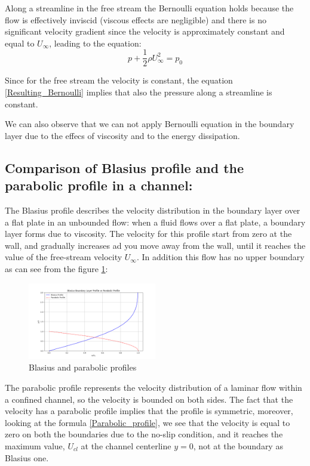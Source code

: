 \documentclass{article}
\begin{document}
Along a streamline in the free stream the Bernoulli equation holds because the flow is effectively inviscid (viscous effects are negligible) and there is no significant velocity gradient since the velocity is approximately constant and equal to  \( U_\infty \), leading to the equation:
\begin{equation} \label{Resulting_Bernoulli}
    p + \frac{1}{2}\rho U_\infty ^2 = p_0
\end{equation}

Since for the free stream the velocity is constant, the equation \eqref{Resulting_Bernoulli} implies that also the pressure along a streamline is constant.

We can also observe that we can not apply Bernoulli equation in the boundary layer due to the effecs of viscosity and to the energy dissipation. 


\subsection{Comparison of Blasius profile and the parabolic profile in a channel:}

The Blasius profile describes the velocity distribution in the boundary layer over a flat plate in an unbounded flow: when a fluid flows over a flat plate, a boundary layer forms due to viscosity. The velocity for this profile start from zero at the wall, and gradually increases ad you move away from the wall, until it reaches the value of the free-stream velocity \(U_\infty\). In addition this flow has no upper boundary as can see from the figure \ref{fig:differences}:

\begin{figure}[h!]
    \centering
    \includegraphics[width=0.5\textwidth]{plot_comparisons.png}
    \caption{Blasius and parabolic profiles}
    \label{fig:differences}
\end{figure}

The parabolic profile represents the velocity distribution of a laminar flow within a confined channel, so the velocity is bounded on both sides. The fact that the velocity has a parabolic profile implies that the profile is symmetric, moreover, looking at the formula \eqref{Parabolic_profile}, we see that the velocity is equal to zero on both the boundaries due to the no-slip condition, and it reaches the maximum value, \(U_{cl}\) at the channel centerline \(y = 0\), not at the boundary as Blasius one.
\end{document}
